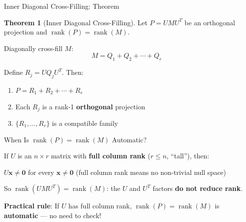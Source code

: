 \documentclass[10pt]{beamer}
\theoremstyle{definition}
\newtheorem{thm}{Theorem}[section]
\newcommand{\x}[1]{\alert{\textbf{#1}}}
\begin{document}
\begin{frame}{Inner Diagonal Cross-Filling: Theorem}

\begin{thm}[Inner Diagonal Cross-Filling]
Let $P = UMU^T$ be an orthogonal projection and $\operatorname{rank}(P) = \operatorname{rank}(M)$.

Diagonally cross-fill $M$:
$$M = Q_1 + Q_2 + \cdots + Q_r$$

Define $R_j = UQ_jU^T$. Then:
\begin{enumerate}
\item $P = R_1 + R_2 + \cdots + R_r$
\item Each $R_j$ is a rank-1 \x{orthogonal} projection
\item $\{R_1, \ldots, R_r\}$ is a compatible family
\end{enumerate}
\end{thm}

\end{frame}

\begin{frame}{When Is $\operatorname{rank}(P) = \operatorname{rank}(M)$ Automatic?}

If $U$ is an $n \times r$ matrix with \x{full column rank} ($r \leq n$, ``tall''), then:

\vspace{0.3em}

$U\mathbf{x} \neq \mathbf{0}$ for every $\mathbf{x} \neq \mathbf{0}$ \quad (full column rank means no non-trivial null space)

\vspace{0.5em}

So $\operatorname{rank}(UMU^T) = \operatorname{rank}(M)$: the $U$ and $U^T$ factors \x{do not reduce rank}.

\vspace{0.5em}

\textbf{Practical rule}: If $U$ has full column rank, $\operatorname{rank}(P) = \operatorname{rank}(M)$ is \x{automatic} --- no need to check!

\end{frame}
\end{document}

